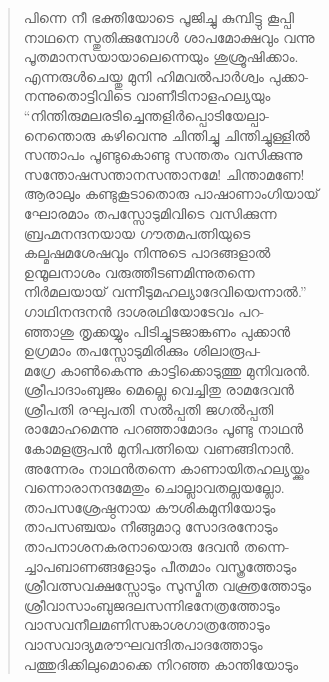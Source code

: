 \begin{verse}
പിന്നെ നീ ഭക്തിയോടെ പൂജിച്ചു കുമ്പിട്ടു കൂപ്പി\\
നാഥനെ സ്തുതിക്കുമ്പോള്‍ ശാപമോക്ഷവും വന്നു\\
പൂതമാനസയായാലെന്നെയും ശുശ്രൂഷിക്കാം.\\
എന്നരുള്‍ചെയ്തു മുനി ഹിമവല്‍പാര്‍ശ്വം പുക്കാ-\\
നന്നുതൊട്ടിവിടെ വാണീടിനാളഹല്യയും\\
“നിന്തിരുമലരടിച്ചെന്തളിര്‍പ്പൊടിയേല്പാ-\\
നെന്തൊരു കഴിവെന്നു ചിന്തിച്ചു ചിന്തിച്ചുള്ളില്‍\\
സന്താപം പൂണ്ടുകൊണ്ടു സന്തതം വസിക്കുന്നു\\
സന്തോഷസന്താനസന്താനമേ! ചിന്താമണേ!\\
ആരാലും കണ്ടുകൂടാതൊരു പാഷാണാംഗിയായ്\\
ഘോരമാം തപസ്സോടുമിവിടെ വസിക്കുന്ന\\
ബ്രഹ്മനന്ദനയായ ഗൗതമപത്നിയുടെ\\
കല്മഷമശേഷവും നിന്നുടെ പാദങ്ങളാല്‍\\
ഉന്മൂലനാശം വരുത്തീടണമിന്നുതന്നെ\\
നിര്‍മലയായ് വന്നീടുമഹല്യാദേവിയെന്നാല്‍.”\\
ഗാഥിനന്ദനന്‍ ദാശരഥിയോടേവം പറ-\\
ഞ്ഞാശു തൃക്കയ്യും പിടിച്ചുടജാങ്കണം പുക്കാന്‍\\
ഉഗ്രമാം തപസ്സോടുമിരിക്കും ശിലാരൂപ-\\
മഗ്രേ കാണ്‍കെന്നു കാട്ടിക്കൊടുത്തു മുനിവരന്‍.\\
ശ്രീപാദാംബുജം മെല്ലെ വെച്ചിതു രാമദേവന്‍\\
ശ്രീപതി രഘുപതി സല്‍പ്പതി ജഗല്‍പ്പതി\\
രാമോഹമെന്നു പറഞ്ഞാമോദം പൂണ്ടു നാഥന്‍\\
കോമളരൂപന്‍ മുനിപത്നിയെ വണങ്ങിനാന്‍.\\
അന്നേരം നാഥന്‍തന്നെ കാണായിതഹല്യയ്ക്കും\\
വന്നൊരാനന്ദമേതും ചൊല്ലാവതല്ലയല്ലോ.\\
താപസശ്രേഷ്ഠനായ കൗശികമുനിയോടും\\
താപസഞ്ചയം നീങ്ങുമാറു സോദരനോടും\\
താപനാശനകരനായൊരു ദേവന്‍ തന്നെ-\\
ച്ചാപബാണങ്ങളോടും പീതമാം വസ്ത്രത്തോടും\\
ശ്രീവത്സവക്ഷസ്സോടും സുസ്മിത വക്ത്രത്തോടും\\
ശ്രീവാസാംബുജദലസന്നിഭനേത്രത്തോടും\\
വാസവനീലമണിസങ്കാശഗാത്രത്തോടും\\
വാസവാദ്യമരൗഘവന്ദിതപാദത്തോടും\\
പത്തുദിക്കിലുമൊക്കെ നിറഞ്ഞ കാന്തിയോടും\\

\end{verse}

